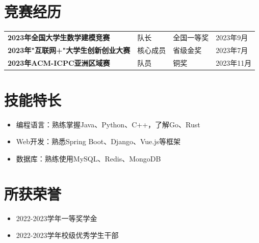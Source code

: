 \section{\makebox[\widthof{\faTrophy}][c]{\color{HIT_Blue}{\faTrophy}}\quad 竞赛经历}
\vspace{-1em}
\begin{table}[h!]
    \begin{tabularx}{\textwidth}{Xp{}p{}p{}}
        \textbf{2023年全国大学生数学建模竞赛} & 队长 & 全国一等奖 & 2023年9月 \\
        \textbf{2023年"互联网+"大学生创新创业大赛} & 核心成员 & 省级金奖 & 2023年7月\\
        \textbf{2023年ACM-ICPC亚洲区域赛} & 队员 & 铜奖 & 2023年11月\\
    \end{tabularx}
\end{table}

\section{\makebox[\widthof{\faWrench}][c]{\color{HIT_Blue}{\faWrench}}\quad 技能特长}
\vspace{0.5em}
\begin{itemize}
    \item 编程语言：熟练掌握Java、Python、C++，了解Go、Rust
    \item Web开发：熟悉Spring Boot、Django、Vue.js等框架
    \item 数据库：熟练使用MySQL、Redis、MongoDB
\end{itemize}

\section{\makebox[\widthof{\faStar}][c]{\color{HIT_Blue}{\faStar}}\quad 所获荣誉}
\vspace{-1em}
\begin{multicols}{2}
    \begin{itemize}
        \item 2022-2023学年一等奖学金
        \item 2022-2023学年校级优秀学生干部
    \end{itemize}
\end{multicols}


